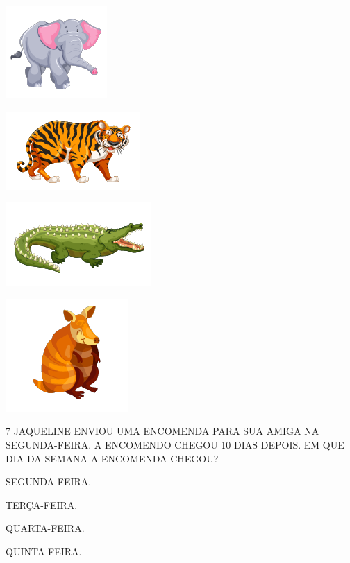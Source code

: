 \begin{multicols}{2}
\begin{escolha}
\item \includegraphics[width=.3\textwidth]{./media/SAEB_1ANO_MAT_FIGURA131a.png}
\item \includegraphics[width=.3\textwidth]{./media/SAEB_1ANO_MAT_FIGURA131b.png}

\columnbreak

\item \includegraphics[width=.3\textwidth]{./media/SAEB_1ANO_MAT_FIGURA131c.png}
\item \includegraphics[width=.3\textwidth]{./media/SAEB_1ANO_MAT_FIGURA131d.png}
\end{escolha}
\end{multicols}

\num{7} JAQUELINE ENVIOU UMA ENCOMENDA PARA SUA AMIGA NA SEGUNDA-FEIRA. A ENCOMENDO CHEGOU 10 DIAS DEPOIS. EM QUE DIA
DA SEMANA A ENCOMENDA CHEGOU?

\begin{escolha}[itemsep=0pt]
\item SEGUNDA-FEIRA.

\item TERÇA-FEIRA.

\item QUARTA-FEIRA.

\item QUINTA-FEIRA.
\end{escolha}

